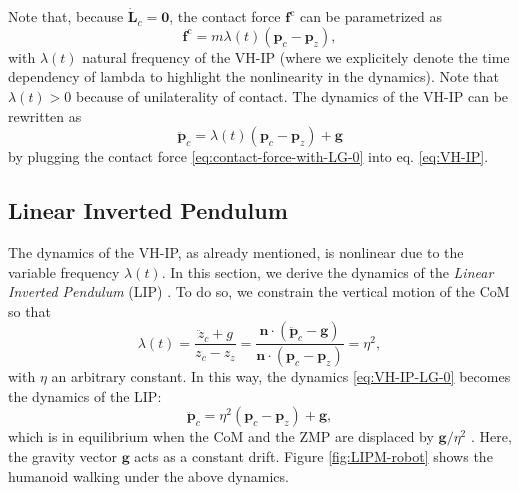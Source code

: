 Note that, because $\dot{\bm{L}}_c=\bm{0}$, the contact force
$\bm{f}^{\mathrm{c}}$ can be parametrized \cite{Caron2020ICRA} as
\begin{equation}
    \label{eq:contact-force-with-LG-0}
    \bm{f}^{\mathrm{c}} = m \lambda(t) (\bm{p}_c - \bm{p}_z),
\end{equation}
with $\lambda(t)$ natural frequency of the VH-IP (where we explicitely
denote the time dependency of lambda to highlight the nonlinearity in the
dynamics). Note that $\lambda(t) > 0$ because
of unilaterality of contact.
The dynamics of the VH-IP can be rewritten as
\begin{equation}
    \label{eq:VH-IP-LG-0}
    \ddot{\bm{p}}_c = \lambda(t) (\bm{p}_c - \bm{p}_z) + \bm{g}
\end{equation}
by plugging the contact force \eqref{eq:contact-force-with-LG-0} into
eq. \eqref{eq:VH-IP}.


\subsection{Linear Inverted Pendulum}
\label{sec:DynamicsHumanoidLocomotion:LinearInvertedPendulum}
The dynamics of the VH-IP, as already mentioned, is nonlinear due to the
variable frequency $\lambda(t)$. In this
section, we derive the dynamics of the \textit{Linear Inverted Pendulum} (LIP)
\cite{Kajita2016IntroductiontoHumanoidRobotics}. To do so,
we constrain the vertical motion of the CoM \cite{Zamparelli2018SYROCO} so that
\begin{equation}
    \lambda(t) = \frac{\ddot{z}_c + g}{z_c - z_z} =
    \frac{\bm{n} \cdot (\ddot{\bm{p}}_c - \bm{g})}{\bm{n} \cdot (\bm{p}_c - \bm{p}_z)} =
    \eta^2,
\end{equation}
with $\eta$ an arbitrary constant. In this way,
the dynamics \eqref{eq:VH-IP-LG-0} becomes the dynamics of the LIP:
\begin{equation}
    \label{eq:LIPM}
    \ddot{\bm{p}}_c = \eta^2 (\bm{p}_c - \bm{p}_z) + \bm{g},
\end{equation}
which is in equilibrium when the CoM and the ZMP are displaced by
$\bm{g}/\eta^2$ \cite{Cipriano2023RAS}. Here, the gravity vector $\bm{g}$
acts as a constant drift. Figure \ref{fig:LIPM-robot} shows the humanoid walking
under the above dynamics.

